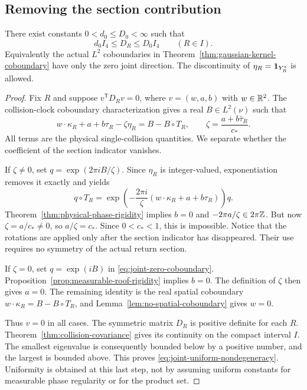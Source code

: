 \subsection{Removing the section contribution}
\begin{theorem}
\label{thm:joint-uniform-nondegeneracy}
There exist constants $0<d_0\le D_0<\infty$ such that
\begin{equation}\label{eq:joint-uniform-nondegeneracy}
 d_0I_4\le D_R\le D_0I_4\qquad(R\in I).
\end{equation}
Equivalently the actual $L^2$ coboundaries in
Theorem~\ref{thm:gaussian-kernel-coboundary} have only the zero joint
direction. The discontinuity of $\eta_R=\mathbf1_{Y_R^*}$ is allowed.
\end{theorem}
\begin{proof}
Fix $R$ and suppose $v^{\mathsf T}D_Rv=0$, where $v=(w,a,b)$ with
$w\in\mathbb R^2$. The collision-clock coboundary characterization gives a
real $B\in L^2(\nu)$ such that
\begin{equation}\label{eq:joint-zero-coboundary}
 w\cdot\kappa_R+a+b\tau_R-\zeta\eta_R=B-B\circ T_R,
 \qquad \zeta=\frac{a+b\bar\tau_R}{c_*}.
\end{equation}
All terms are the physical single-collision quantities. We separate
whether the coefficient of the section indicator vanishes.

If $\zeta\ne0$, set $q=\exp(2\pi i B/\zeta)$. Since $\eta_R$ is
integer-valued, exponentiation removes it exactly and yields
\[
 q\circ T_R
 =\exp\!\left(-\frac{2\pi i}{\zeta}
          (w\cdot\kappa_R+a+b\tau_R)\right)q.
\]
Theorem~\ref{thm:physical-phase-rigidity} implies $b=0$ and
$-2\pi a/\zeta\in2\pi\mathbb Z$. But now
$\zeta=a/c_*\ne0$, so $a/\zeta=c_*$. Since $0<c_*<1$, this is
impossible. Notice that the rotations are applied only after the
section indicator has disappeared. Their use requires no symmetry of
the actual return section.

If $\zeta=0$, set $q=\exp(iB)$ in
\eqref{eq:joint-zero-coboundary}. Proposition~\ref{prop:measurable-roof-rigidity}
implies $b=0$. The definition of $\zeta$ then gives $a=0$.
The remaining identity is the real spatial coboundary
$w\cdot\kappa_R=B-B\circ T_R$, and
Lemma~\ref{lem:no-spatial-coboundary} gives $w=0$.

Thus $v=0$ in all cases. The symmetric matrix $D_R$ is positive definite
for each $R$. Theorem~\ref{thm:collision-covariance} gives its continuity
on the compact interval $I$. The smallest eigenvalue is consequently
bounded below by a positive number, and the largest is bounded above.
This proves \eqref{eq:joint-uniform-nondegeneracy}. Uniformity is obtained
at this last step, not by assuming uniform constants for measurable
phase regularity or for the product set.
\end{proof}

